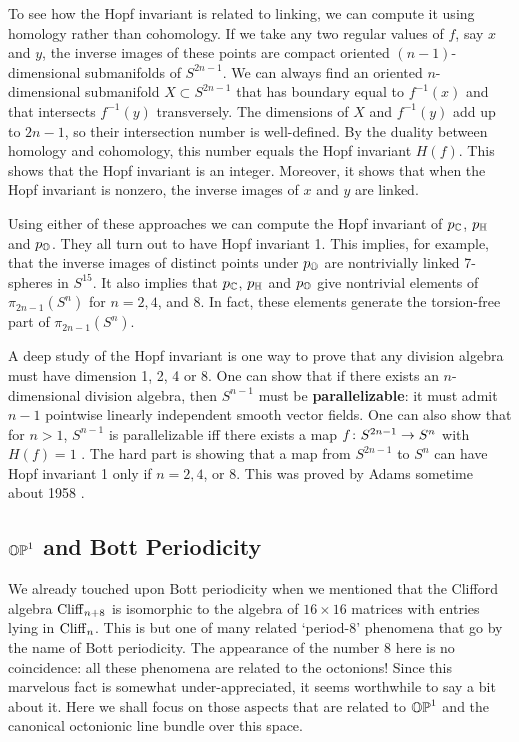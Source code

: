 To see how the Hopf invariant is related to linking, we can compute it 
using homology rather than cohomology.  If we take any two regular 
values of $f$, say $x$ and $y$, the inverse images of these points are 
compact oriented $(n-1)$-dimensional submanifolds of $S^{2n-1}$.   We 
can always find an oriented $n$-dimensional submanifold $X \subset 
S^{2n-1}$ that has boundary equal to $f^{-1}(x)$ and that intersects 
$f^{-1}(y)$ transversely.  The dimensions of $X$ and $f^{-1}(y)$ add up 
to $2n-1$, so their intersection number is well-defined.  By the  
duality between homology and cohomology, this number equals the Hopf 
invariant $H(f)$.   This shows that the Hopf invariant is an integer.  
Moreover, it shows that when the Hopf invariant is nonzero, the inverse 
images of $x$ and $y$ are linked. 

Using either of these approaches we can compute the Hopf invariant of 
$p_{\mathbb C}$, $p_{\mathbb H}$ and $p_{\mathbb O}$.  They all turn out to have Hopf invariant 1.  
This implies, for example, that the inverse images of distinct points 
under $p_{\mathbb O}$ are nontrivially linked 7-spheres in $S^{15}$.  It 
also implies that $p_{\mathbb C}$, $p_{\mathbb H}$ and $p_{\mathbb O}$ give nontrivial elements of 
$\pi_{2n-1}(S^n)$ for $n = 2, 4$, and $8$.  In fact, these elements
generate the torsion-free part of $\pi_{2n-1}(S^n)$.

A deep study of the Hopf invariant is one way to prove that any division
algebra must have dimension 1, 2, 4 or 8.  One can show that if there
exists an $n$-dimensional division algebra, then $S^{n-1}$ must be {\bf
parallelizable}: it must admit $n - 1$ pointwise linearly independent
smooth vector fields.  One can also show that for $n > 1$, $S^{n-1}$ is
parallelizable iff there exists a map $f \colon S^{2n-1} \to S^n$ with
$H(f) = 1$ \cite{AH,BM,Kervaire}.  The hard part is showing that a map from
$S^{2n-1}$ to $S^n$ can have Hopf invariant 1 only if $n = 2, 4$, or
$8$.  This was proved by Adams sometime about 1958 \cite{Adams0}.

\subsection{${\mathbb {OP}}^1$ and Bott Periodicity} \label{bott}  
 
We already touched upon Bott periodicity when we mentioned that the 
Clifford algebra ${\rm Cliff}_{n+8}$ is isomorphic to the algebra of $16  
\times 16$ matrices with entries lying in ${\rm Cliff}_n$.  This is but one 
of many related `period-8' phenomena that go by the name of Bott  
periodicity.  The appearance of the number 8 here is no coincidence: all 
these phenomena are related to the octonions!  Since this marvelous   
fact is somewhat under-appreciated, it seems worthwhile to say a bit   
about it.   Here we shall focus on those aspects that are related to   
${\mathbb {OP}}^1$ and the canonical octonionic line bundle over this space.    
  

